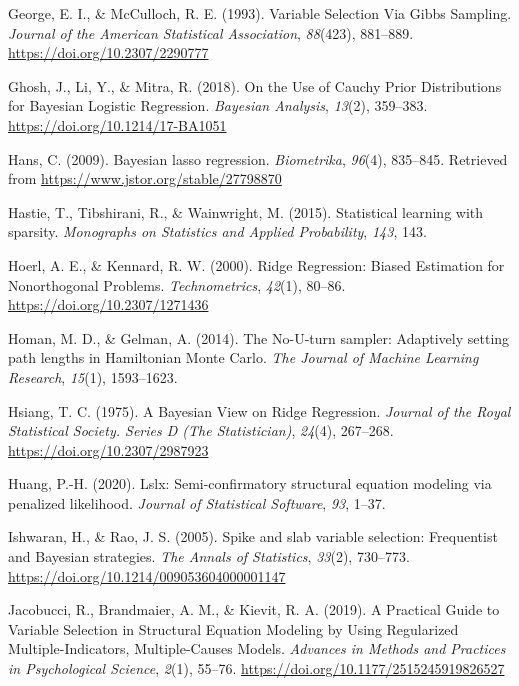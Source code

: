 \documentclass[
  man, donotrepeattitle,floatsintext]{apa6}
\newlength{\cslhangindent}
\newenvironment{CSLReferences}[2] %
 {\begin{list}{}{%
  \setlength{\itemindent}{0pt}
  \setlength{\leftmargin}{0pt}
  \setlength{\parsep}{0pt}
  \ifodd #1
   \setlength{\leftmargin}{\cslhangindent}
   \setlength{\itemindent}{-1\cslhangindent}
  \fi
  \setlength{\itemsep}{#2\baselineskip}}}
 {\end{list}}
\begin{document}
\begin{CSLReferences}{1}{0}
George, E. I., \& McCulloch, R. E. (1993). Variable {Selection} {Via} {Gibbs} {Sampling}. \emph{Journal of the American Statistical Association}, \emph{88}(423), 881--889. \url{https://doi.org/10.2307/2290777}

Ghosh, J., Li, Y., \& Mitra, R. (2018). On the {Use} of {Cauchy} {Prior} {Distributions} for {Bayesian} {Logistic} {Regression}. \emph{Bayesian Analysis}, \emph{13}(2), 359--383. \url{https://doi.org/10.1214/17-BA1051}

Hans, C. (2009). Bayesian lasso regression. \emph{Biometrika}, \emph{96}(4), 835--845. Retrieved from \url{https://www.jstor.org/stable/27798870}

Hastie, T., Tibshirani, R., \& Wainwright, M. (2015). Statistical learning with sparsity. \emph{Monographs on Statistics and Applied Probability}, \emph{143}, 143.

Hoerl, A. E., \& Kennard, R. W. (2000). Ridge {Regression}: {Biased} {Estimation} for {Nonorthogonal} {Problems}. \emph{Technometrics}, \emph{42}(1), 80--86. \url{https://doi.org/10.2307/1271436}

Homan, M. D., \& Gelman, A. (2014). The {No}-{U}-turn sampler: Adaptively setting path lengths in {Hamiltonian} {Monte} {Carlo}. \emph{The Journal of Machine Learning Research}, \emph{15}(1), 1593--1623.

Hsiang, T. C. (1975). A {Bayesian} {View} on {Ridge} {Regression}. \emph{Journal of the Royal Statistical Society. Series D (The Statistician)}, \emph{24}(4), 267--268. \url{https://doi.org/10.2307/2987923}

Huang, P.-H. (2020). Lslx: Semi-confirmatory structural equation modeling via penalized likelihood. \emph{Journal of Statistical Software}, \emph{93}, 1--37.

Ishwaran, H., \& Rao, J. S. (2005). Spike and slab variable selection: {Frequentist} and {Bayesian} strategies. \emph{The Annals of Statistics}, \emph{33}(2), 730--773. \url{https://doi.org/10.1214/009053604000001147}

Jacobucci, R., Brandmaier, A. M., \& Kievit, R. A. (2019). A {Practical} {Guide} to {Variable} {Selection} in {Structural} {Equation} {Modeling} by {Using} {Regularized} {Multiple}-{Indicators}, {Multiple}-{Causes} {Models}. \emph{Advances in Methods and Practices in Psychological Science}, \emph{2}(1), 55--76. \url{https://doi.org/10.1177/2515245919826527}


\end{CSLReferences}
\end{document}
